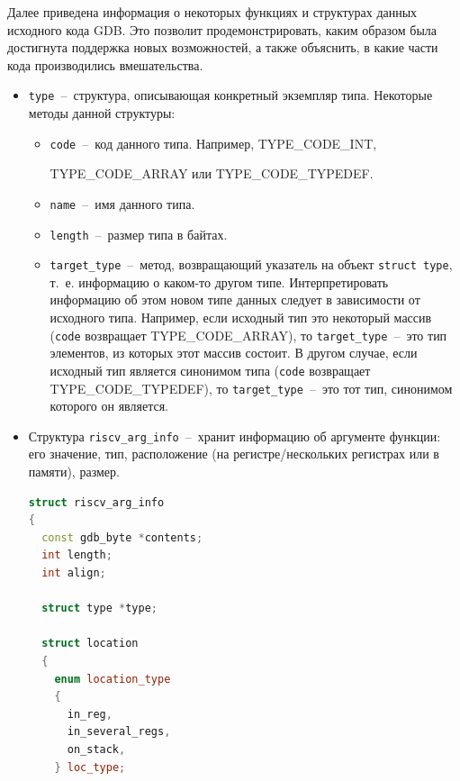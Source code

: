 Далее приведена информация о некоторых функциях и структурах данных
исходного кода GDB. Это позволит продемонстрировать, каким образом была достигнута
поддержка новых возможностей, а также объяснить, в какие части кода производились вмешательства.

\begin{itemize}

\item \texttt{type}~--~структура, описывающая конкретный экземпляр типа.
Некоторые методы данной структуры:

\begin{itemize}
  \item \texttt{code}~--~код данного типа. Например, TYPE\_CODE\_INT, 

    TYPE\_CODE\_ARRAY или TYPE\_CODE\_TYPEDEF.

  \item \texttt{name}~--~имя данного типа.

  \item \texttt{length}~--~размер типа в байтах.

  \item \texttt{target\_type}~--~метод, возвращающий указатель на объект 
    \texttt{struct type}, т.~е. информацию о каком-то другом типе. Интерпретировать
    информацию об этом новом типе данных следует в зависимости от исходного типа.
    Например, если исходный тип это некоторый массив (\texttt{code} возвращает TYPE\_CODE\_ARRAY),
    то \texttt{target\_type}~--~это тип элементов, из которых этот массив состоит.
    В другом случае, если исходный тип является синонимом типа (\texttt{code} возвращает TYPE\_CODE\_TYPEDEF),
    то \texttt{target\_type}~--~это тот тип, синонимом которого он является.

\end{itemize}

\item Структура \texttt{riscv\_arg\_info}~--~хранит информацию об аргументе функции: его значение, тип, 
      расположение (на регистре/нескольких регистрах или в памяти), размер.

\begin{samepage}
\begin{lstlisting}[language=C++, caption=Структура riscv\_arg\_info, label=lst:struct:riscv_arg_info]
struct riscv_arg_info
{
  const gdb_byte *contents;
  int length;
  int align;

  struct type *type;

  struct location
  {
    enum location_type
    {
      in_reg,
      in_several_regs,
      on_stack,
    } loc_type;


\end{lstlisting}
\end{samepage}
\end{itemize}
